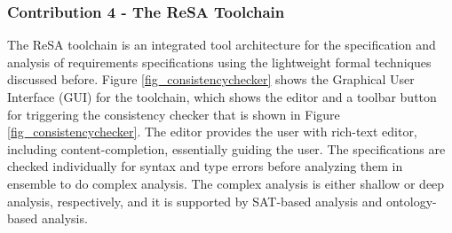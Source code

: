 \subsubsection{Contribution 4 - The ReSA Toolchain}
The ReSA toolchain \cite{resatool} is an integrated tool architecture for the specification and analysis of requirements specifications using the lightweight formal techniques discussed before. Figure \ref{fig_consistencychecker} shows the Graphical User Interface (GUI) for the toolchain, which shows the editor and a toolbar button for triggering the consistency checker that is shown in Figure \ref{fig_consistencychecker}. The editor provides the user with rich-text editor, including content-completion, essentially guiding the user. The specifications are checked individually for syntax and type errors before analyzing them in ensemble to do complex analysis. The complex analysis is either shallow or deep analysis, respectively, and it is supported by SAT-based analysis and ontology-based analysis.
